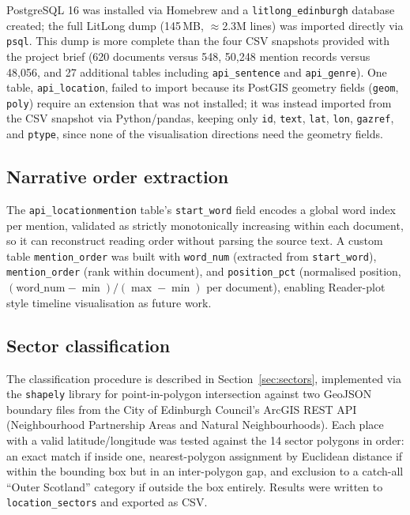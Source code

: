 \documentclass[logo,msc]{infthesis}
\begin{document}
PostgreSQL 16 was installed via Homebrew and a \texttt{litlong\_edinburgh} database created; the full LitLong dump (145\,MB, $\approx$2.3M lines) was imported directly via \texttt{psql}. This dump is more complete than the four CSV snapshots provided with the project brief (620 documents versus 548, 50,248 mention records versus 48,056, and 27 additional tables including \texttt{api\_sentence} and \texttt{api\_genre}). One table, \texttt{api\_location}, failed to import because its PostGIS geometry fields (\texttt{geom}, \texttt{poly}) require an extension that was not installed; it was instead imported from the CSV snapshot via Python/pandas, keeping only \texttt{id}, \texttt{text}, \texttt{lat}, \texttt{lon}, \texttt{gazref}, and \texttt{ptype}, since none of the visualisation directions need the geometry fields.

\subsection*{Narrative order extraction}

The \texttt{api\_locationmention} table's \texttt{start\_word} field encodes a global word index per mention, validated as strictly monotonically increasing within each document, so it can reconstruct reading order without parsing the source text. A custom table \texttt{mention\_order} was built with \texttt{word\_num} (extracted from \texttt{start\_word}), \texttt{mention\_order} (rank within document), and \texttt{position\_pct} (normalised position, $(\text{word\_num}-\min)/(\max-\min)$ per document), enabling Reader-plot style timeline visualisation as future work.

\subsection*{Sector classification}

The classification procedure is described in Section~\ref{sec:sectors}, implemented via the \texttt{shapely} library for point-in-polygon intersection against two GeoJSON boundary files from the City of Edinburgh Council's ArcGIS REST API (Neighbourhood Partnership Areas and Natural Neighbourhoods). Each place with a valid latitude/longitude was tested against the 14 sector polygons in order: an exact match if inside one, nearest-polygon assignment by Euclidean distance if within the bounding box but in an inter-polygon gap, and exclusion to a catch-all ``Outer Scotland'' category if outside the box entirely. Results were written to \texttt{location\_sectors} and exported as CSV.
\end{document}
